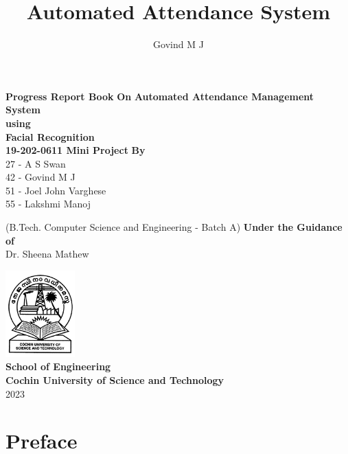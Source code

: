 \documentclass[12pt]{book}
\title{Automated Attendance System}
\author{Govind M J}
\begin{document}
	\pagestyle{plain}
    \setlength\columnsep{20pt}
    \setlength{\columnseprule}{1pt}
	\centering
    \LARGE
    \thispagestyle{empty}
    \textbf{Progress Report Book} \vfill
    \large
    \textbf{On} \vfill
    \huge
    \textbf{\Large Automated Attendance Management System\\ using\\ Facial Recognition}
    \Large \\[15pt]
    \textbf{19-202-0611 Mini Project} \vfill
    \vfill
    \large
    \textbf{By} \\ [6pt]
    \Large
   	27 - A S Swan \\
    42 - Govind M J \\
    51 - Joel John Varghese \\
    55 - Lakshmi Manoj \vfill
    
    \Large
    (B.Tech. Computer Science and Engineering - Batch A) \vfill
    \textbf{Under the Guidance of} \\[6pt]
    Dr. Sheena Mathew \vfill
    

    \vfill
    
    \includegraphics[width=0.20\textwidth]{./logo.png}\\[0.5cm]
    \textbf{School of Engineering\\ Cochin University of Science and Technology} \\
    [10pt]
    2023 \\
    
    \chapter*{Preface}
    \normalsize
    \paragraph{}
    
\end{document}
